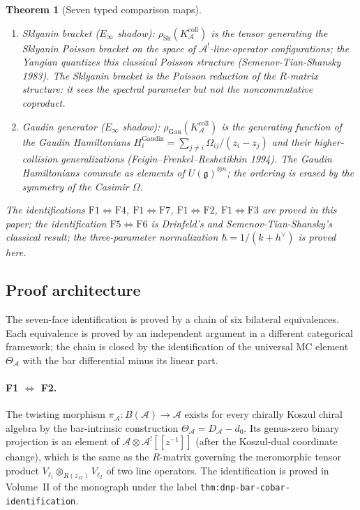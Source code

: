 \documentclass[11pt]{article}
\theoremstyle{plain}
\newtheorem{theorem}{Theorem}[section]
\theoremstyle{definition}
\theoremstyle{remark}
\newcommand{\fg}{\mathfrak{g}}
\newcommand{\cA}{\mathcal{A}}
\begin{document}
\begin{theorem}[Seven typed comparison maps]
\begin{enumerate}[label=\textup{\textbf{(F\arabic*)}}]
 $\rho_Y(K_\cA^{\mathrm{coll}})$ is the
 classical $r$-matrix of the Yangian $Y_{\hbar}(\cA^{!})$; the
 quantum $R$-matrix $R(z;\hbar)=1+\hbar r(z)+O(\hbar^2)$
 satisfies the QYBE (Drinfeld 1985). The Yangian is the
 prototypical $E_1$-chiral algebra: its coproduct
 $\Delta_z$ depends on the spectral parameter.
 \item \emph{Sklyanin bracket}\/ ($E_\infty$ shadow):
 $\rho_{\mathrm{Sk}}(K_\cA^{\mathrm{coll}})$ is
 the tensor generating the Sklyanin Poisson bracket on the space
 of $\cA^{!}$-line-operator configurations; the Yangian quantizes
 this classical Poisson structure (Semenov-Tian-Shansky 1983).
 The Sklyanin bracket is the Poisson reduction of the $R$-matrix
 structure: it sees the spectral parameter but not the
 noncommutative coproduct.
 \item \emph{Gaudin generator}\/ ($E_\infty$ shadow):
 $\rho_{\mathrm{Gau}}(K_\cA^{\mathrm{coll}})$ is
 the generating function of the Gaudin Hamiltonians
 $H_i^{\mathrm{Gaudin}}=\sum_{j\neq i}\Omega_{ij}/(z_i-z_j)$
 and their higher-collision generalizations
 (Feigin--Frenkel--Reshetikhin 1994). The Gaudin Hamiltonians
 commute as elements of $U(\fg)^{\otimes n}$; the ordering is
 erased by the symmetry of the Casimir $\Omega$.
\end{enumerate}
The identifications $\mathrm{F1}\Leftrightarrow\mathrm{F4}$,
$\mathrm{F1}\Leftrightarrow\mathrm{F7}$,
$\mathrm{F1}\Leftrightarrow\mathrm{F2}$,
$\mathrm{F1}\Leftrightarrow\mathrm{F3}$ are proved in this paper;
the identification $\mathrm{F5}\Leftrightarrow\mathrm{F6}$ is
Drinfeld's and Semenov-Tian-Shansky's classical result; the
three-parameter normalization $\hbar=1/(k+h^{\vee})$ is proved here.
\end{theorem}

\subsection{Proof architecture}

The seven-face identification is proved by a chain of six bilateral
equivalences. Each equivalence is proved by an independent
argument in a different categorical framework; the chain is
closed by the identification of the universal MC element
$\Theta_{\cA}$ with the bar differential minus its linear part.

\paragraph{F1 $\Leftrightarrow$ F2.}
The twisting morphism $\pi_{\cA}\colon B(\cA)\to\cA$ exists for
every chirally Koszul chiral algebra by the bar-intrinsic
construction $\Theta_{\cA}=D_{\cA}-d_0$. Its genus-zero binary
projection is an element of $\cA\otimes\cA^{!}[\![z^{-1}]\!]$
(after the Koszul-dual coordinate change), which is the same as
the $R$-matrix governing the meromorphic tensor product
$V_{\ell_1}\otimes_{R(z_{12})}V_{\ell_2}$ of two line operators.
The identification is proved in Volume~II of the monograph under
the label \texttt{thm:dnp-bar-cobar-identification}.
\end{document}
